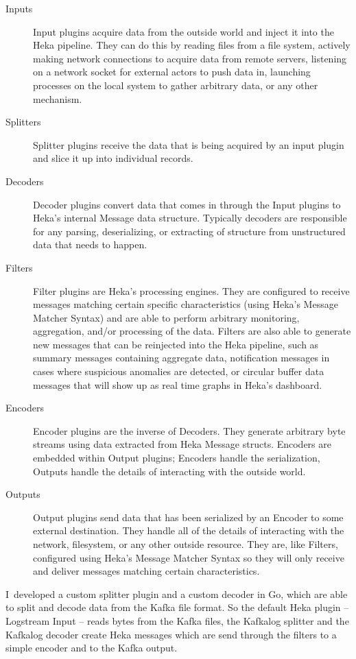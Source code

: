 \begin{description}
  \item[Inputs] Input plugins acquire data from the outside world and inject it into the Heka pipeline. They can do this by reading files from a file system, actively making network connections to acquire data from remote servers, listening on a network socket for external actors to push data in, launching processes on the local system to gather arbitrary data, or any other mechanism.
  \item[Splitters] Splitter plugins receive the data that is being acquired by an input plugin and slice it up into individual records.
  \item[Decoders] Decoder plugins convert data that comes in through the Input plugins to Heka’s internal Message data structure. Typically decoders are responsible for any parsing, deserializing, or extracting of structure from unstructured data that needs to happen.
  \item[Filters] Filter plugins are Heka’s processing engines. They are configured to receive messages matching certain specific characteristics (using Heka’s Message Matcher Syntax) and are able to perform arbitrary monitoring, aggregation, and/or processing of the data. Filters are also able to generate new messages that can be reinjected into the Heka pipeline, such as summary messages containing aggregate data, notification messages in cases where suspicious anomalies are detected, or circular buffer data messages that will show up as real time graphs in Heka’s dashboard. 
  \item[Encoders] Encoder plugins are the inverse of Decoders. They generate arbitrary byte streams using data extracted from Heka Message structs. Encoders are embedded within Output plugins; Encoders handle the serialization, Outputs handle the details of interacting with the outside world.
  \item[Outputs] Output plugins send data that has been serialized by an Encoder to some external destination. They handle all of the details of interacting with the network, filesystem, or any other outside resource. They are, like Filters, configured using Heka’s Message Matcher Syntax so they will only receive and deliver messages matching certain characteristics.
\end{description}

I~developed a custom splitter plugin and a custom decoder in Go, which are able to split and decode data from the Kafka file format. So the default Heka plugin -- Logstream Input -- reads bytes from the Kafka files, the Kafkalog splitter and the Kafkalog decoder create Heka messages which are send through the filters to a simple encoder and to the Kafka output.

